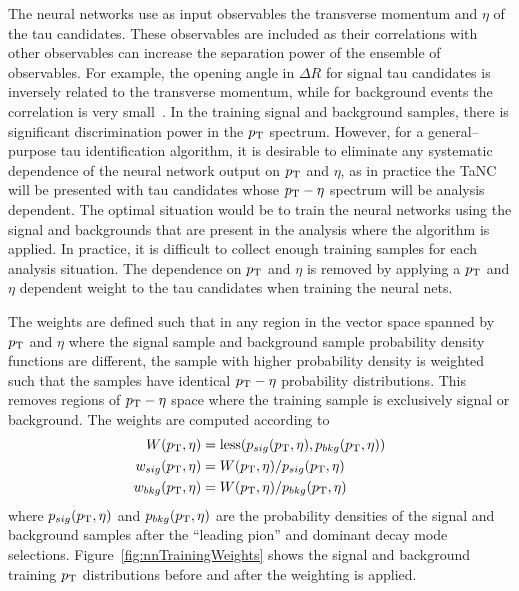 The neural networks use as input observables the transverse momentum and $\eta$
of the tau candidates.  These observables are included as their correlations
with other observables can increase the separation power of the ensemble of
observables.  For example, the opening angle in $\Delta R$ for signal
tau candidates is inversely related to the transverse momentum, while for
background events the correlation is very small~\cite{DavisTau}. In the training
signal and background samples, there is significant discrimination power in the
$p_{\mathrm{T}}$ spectrum.   However, for a general--purpose tau identification algorithm,
it is desirable to eliminate any systematic dependence of the neural network
output on $p_{\mathrm{T}}$ and $\eta$, as in practice the TaNC will be presented with
tau candidates whose $p_{\mathrm{T}}-\eta$ spectrum will be analysis dependent. The
optimal situation would be to train the neural networks using the signal and
backgrounds that are present in the analysis where the algorithm is applied.  In
practice, it is difficult to collect enough training samples for each analysis
situation.  The dependence on $p_{\mathrm{T}}$ and $\eta$ is removed by applying a $p_{\mathrm{T}}$
and $\eta$ dependent weight to the tau candidates when training the neural
nets.  

The weights are defined such that in any region in the vector space spanned by
$p_{\mathrm{T}}$ and $\eta$ where the signal sample and background sample probability
density functions are different, the sample with higher probability density is
weighted such that the samples have identical $p_{\mathrm{T}}-\eta$ probability
distributions.  This removes regions of $p_{\mathrm{T}}-\eta$ space where the training
sample is exclusively signal or background.  The weights are computed according to
\begin{align*}
   W(p_{\mathrm{T}}, \eta) &=  {\rm less}(p_{sig}(p_{\mathrm{T}}, \eta), p_{bkg}(p_{\mathrm{T}}, \eta))\\
   w_{sig}(p_{\mathrm{T}}, \eta) &=  W(p_{\mathrm{T}}, \eta)/p_{sig}(p_{\mathrm{T}}, \eta) \\
   w_{bkg}(p_{\mathrm{T}}, \eta) &=  W(p_{\mathrm{T}}, \eta)/p_{bkg}(p_{\mathrm{T}}, \eta) 
\end{align*}
where \mbox{$p_{sig}(p_{\mathrm{T}},\eta)$} and \mbox{$p_{bkg}(p_{\mathrm{T}},\eta)$} are the probability densities of
the signal and background samples after the ``leading pion'' and dominant decay mode
selections. Figure~\ref{fig:nnTrainingWeights} shows the signal and background
training $p_{\mathrm{T}}$ distributions before and after the weighting is applied.


